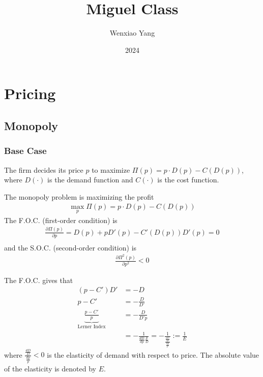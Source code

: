 \documentclass[11pt]{elegantbook}
\title{Miguel Class}
\author{Wenxiao Yang}
\institute{Haas School of Business, University of California Berkeley}
\date{2024}
\begin{document}
\maketitle

\frontmatter
\tableofcontents

\mainmatter



\chapter{Pricing}
\section{Monopoly}
\subsection{Base Case}
The firm decides its price $p$ to maximize $\Pi(p)=p\cdot D(p)-C(D(p))$, where $D(\cdot)$ is the demand function and $C(\cdot)$ is the cost function.

The monopoly problem is maximizing the profit
\begin{equation}
    \begin{aligned}
        \max_p \Pi(p)=p\cdot D(p)-C(D(p))
    \end{aligned}
    \nonumber
\end{equation}
The F.O.C. (first-order condition) is
\begin{equation}
    \begin{aligned}
        \frac{\partial \Pi(p)}{\partial p}=D(p)+pD'(p)-C'(D(p))D'(p)=0\\
    \end{aligned}
    \nonumber
\end{equation}
and the S.O.C. (second-order condition) is
\begin{equation}
    \begin{aligned}
        \frac{\partial \Pi^2(p)}{\partial p^2}<0
    \end{aligned}
    \nonumber
\end{equation}

The F.O.C. gives that
\begin{equation}
    \begin{aligned}
        (p-C')D'&=-D\\
        p-C'&=-\frac{D}{D'}\\
        \underbrace{\frac{p-C'}{p}}_\text{Lerner Index}&=-\frac{D}{D'p}\\
        &=-\frac{1}{\frac{d D}{d p}\frac{p}{D}}=-\frac{1}{\frac{\frac{d D}{D}}{\frac{d p}{p}}}:=\frac{1}{E}
    \end{aligned}
    \nonumber
\end{equation}
where $\frac{\frac{d D}{D}}{\frac{d p}{p}}<0$ is the elasticity of demand with respect to price. The absolute value of the elasticity is denoted by $E$.
\end{document}

